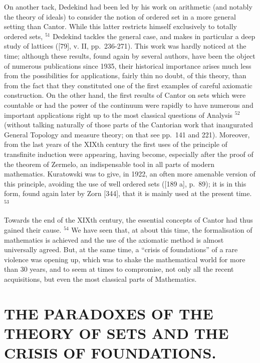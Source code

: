 On another tack, Dedekind had been led by his work on arithmetic (and notably the theory of ideals) to consider the notion of ordered set in a more general setting than Cantor. While this latter restricts himself exclusively to totally ordered sets, \(^{51}\) Dedekind tackles the general case, and makes in particular a deep study of lattices ({[}79{]}, v. II, pp.~236-271). This work was hardly noticed at the time; although these results, found again by several authors, have been the object of numerous publications since 1935, their historical importance arises much less from the possibilities for applications, fairly thin no doubt, of this theory, than from the fact that they constituted one of the first examples of careful axiomatic construction. On the other hand, the first results of Cantor on sets which were countable or had the power of the continuum were rapidly to have numerous and important applications right up to the most classical questions of Analysis \(^{52}\) (without talking naturally of those parts of the Cantorian work that inaugurated General Topology and measure theory; on that see pp.~141 and 221). Moreover, from the last years of the XIXth century the first uses of the principle of transfinite induction were appearing, having become, especially after the proof of the theorem of Zermelo, an indispensable tool in all parts of modern mathematics. Kuratowski was to give, in 1922, an often more amenable version of this principle, avoiding the use of well ordered sets ({[}189 a{]}, p.~89); it is in this form, found again later by Zorn {[}344{]}, that it is mainly used at the present time. \(^{53}\)

Towards the end of the XIXth century, the essential concepts of Cantor had thus gained their cause. \(^{54}\) We have seen that, at about this time, the formalisation of mathematics is achieved and the use of the axiomatic method is almost universally agreed. But, at the same time, a ``crisis of foundations'' of a rare violence was opening up, which was to shake the mathematical world for more than 30 years, and to seem at times to compromise, not only all the recent acquisitions, but even the most classical parts of Mathematics.

\section*{THE PARADOXES OF THE THEORY OF SETS AND THE CRISIS OF FOUNDATIONS.}
{}

